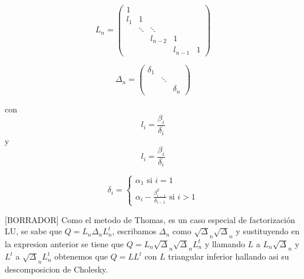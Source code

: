 \documentclass{article}
\begin{document}
    \begin{equation*}
        L_{n} = \begin{pmatrix} 
                1   &        &         &         &   \\ 
                l_1 &   1    &         &         &   \\
                    & \ddots & \ddots  &         &   \\
                    &        & l_{n-2} &    1    &   \\
                    &        &         & l_{n-1} & 1
            \end{pmatrix}
    \end{equation*}

    \begin{equation*}
        \Delta_n = \begin{pmatrix} 
                \delta_1 &        &          \\ 
                         & \ddots &          \\
                         &        & \delta_n
            \end{pmatrix}
    \end{equation*}

    con \begin{equation} l_i = \frac{\beta_i}{\delta_i} \end{equation}
    y \begin{equation} l_i = \frac{\beta_i}{\delta_i} \end{equation}

    \begin{equation}
        \delta_i =
            \begin{cases}
                \alpha_1 \text{ si } i = 1 \\
                \alpha_i - \frac{\beta_{i-1}^2}{\delta_{i-1}} \text{ si } i>1
            \end{cases}
    \end{equation}

    [BORRADOR] Como el metodo de Thomas, es un caso especial de factorización LU, se sabe que $ Q = L_n\Delta_nL_{n}^{t} $,
    escribamos $\Delta_n$ como $\sqrt\Delta_n\sqrt\Delta_n$ y sustituyendo en la expresion anterior se tiene que
    $ Q = L_n\sqrt\Delta_n\sqrt\Delta_nL_{n}^{t} $ y llamando $L$ a $L_n\sqrt\Delta_n$ y $L^t$ a $\sqrt\Delta_nL_{n}^{t}$
    obtenemos que $Q = LL^t$ con $L$ triangular inferior hallando asi su descomposicion de Cholesky.

    \subsection{}
\end{document}

